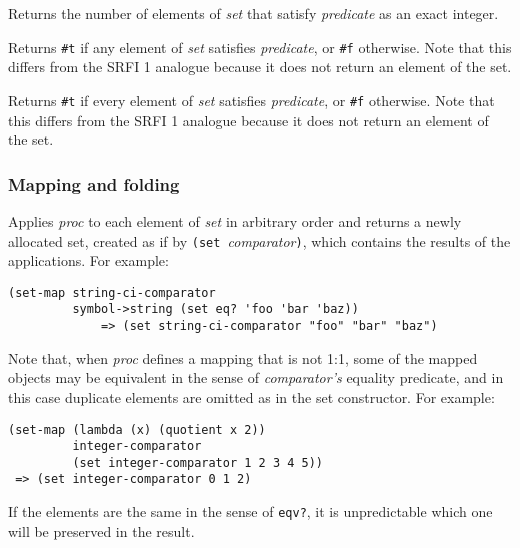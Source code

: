 \begin{entry}{%
  }

  Returns the number of elements of \emph{set} that satisfy
  \emph{predicate} as an exact integer.
\end{entry}

\begin{entry}{%
  }

  Returns \texttt{\#t} if any element of \emph{set} satisfies
  \emph{predicate}, or \texttt{\#f} otherwise. Note that this differs
  from the SRFI 1 analogue because it does not return an element of
  the set.
\end{entry}

\begin{entry}{%
  }

  Returns \texttt{\#t} if every element of \emph{set} satisfies
  \emph{predicate}, or \texttt{\#f} otherwise. Note that this differs
  from the SRFI 1 analogue because it does not return an element of
  the set.
\end{entry}

\subsubsection{Mapping and folding}

\begin{entry}{%
  }

  Applies \emph{proc} to each element of \emph{set} in arbitrary order
  and returns a newly allocated set, created as if by \texttt{(set\
  }\emph{comparator}\texttt{)}, which contains the results of the
  applications. For example:

\begin{verbatim}
(set-map string-ci-comparator 
         symbol->string (set eq? 'foo 'bar 'baz))
             => (set string-ci-comparator "foo" "bar" "baz")
\end{verbatim}

  Note that, when \emph{proc} defines a mapping that is not 1:1, some
  of the mapped objects may be equivalent in the sense of
  \emph{comparator's} equality predicate, and in this case duplicate
  elements are omitted as in the set constructor. For example:

\begin{verbatim}
(set-map (lambda (x) (quotient x 2))
         integer-comparator
         (set integer-comparator 1 2 3 4 5))
 => (set integer-comparator 0 1 2)
\end{verbatim}

  If the elements are the same in the sense of \texttt{eqv?}, it is
  unpredictable which one will be preserved in the result.
\end{entry}

